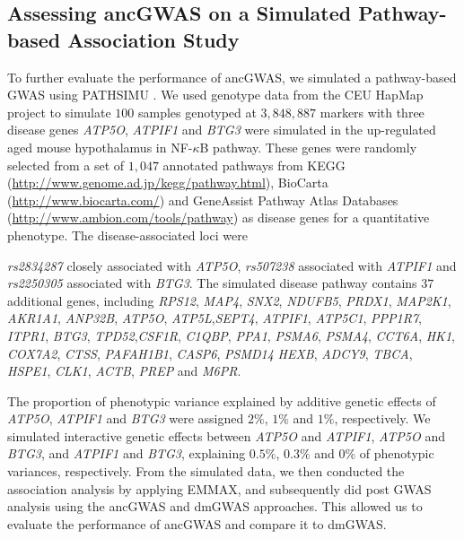 \documentclass[10pt]{article}
\begin{document}
\subsection*{Assessing ancGWAS on a Simulated Pathway-based Association Study}
\label{ancPath}

To further evaluate the performance of ancGWAS, we simulated a pathway-based GWAS using PATHSIMU \cite{pathsi}. We used genotype data from the CEU HapMap project \cite{hapm} to simulate $100$ samples genotyped at $3,848,887$ markers with three disease genes \textit{ATP5O}, \textit{ATPIF1} and \textit{BTG3} were simulated in the up-regulated aged mouse hypothalamus in NF-$\kappa$B pathway. These genes were randomly selected from a set of $1,047$ annotated pathways from KEGG (\url{http://www.genome.ad.jp/kegg/pathway.html}), BioCarta (\url{http://www.biocarta.com/}) and GeneAssist Pathway Atlas Databases (\url{http://www.ambion.com/tools/pathway}) as disease genes for a quantitative phenotype. The disease-associated loci were {\small \textit{rs2834287} closely associated with \textit{ATP5O}, \textit{rs507238} associated with \textit{ATPIF1} and \textit{rs2250305} associated with \textit{BTG3}. The simulated disease pathway contains $37$ additional genes, including \textit{RPS12}, \textit{MAP4}, \textit{SNX2}, \textit{NDUFB5}, \textit{PRDX1},  \textit{MAP2K1}, \textit{AKR1A1}, \textit{ANP32B}, \textit{ATP5O}, \textit{ATP5L},\textit{SEPT4},  \textit{ATPIF1}, \textit{ATP5C1}, \textit{PPP1R7}, \textit{ITPR1}, \textit{BTG3}, \textit{TPD52},\textit{CSF1R}, \textit{C1QBP}, \textit{PPA1}, \textit{PSMA6}, \textit{PSMA4}, \textit{CCT6A}, \textit{HK1}, \textit{COX7A2}, \textit{CTSS}, \textit{PAFAH1B1}, \textit{CASP6}, \textit{PSMD14} \textit{HEXB}, \textit{ADCY9}, \textit{TBCA}, \textit{HSPE1}, \textit{CLK1}, \textit{ACTB}, \textit{PREP} and \textit{M6PR}. 

The proportion of phenotypic variance explained by additive genetic effects of \textit{ATP5O}, \textit{ATPIF1} and \textit{BTG3} were assigned $2\%$, $1\%$ and $1\%$, respectively. We simulated interactive genetic effects between \textit{ATP5O} and \textit{ATPIF1}, \textit{ATP5O} and \textit{BTG3}, and \textit{ATPIF1} and \textit{BTG3}, explaining $0.5\%$, $0.3\%$ and $0\%$ of phenotypic variances, respectively. From the simulated data, we then conducted the association analysis by applying EMMAX, and subsequently did post GWAS analysis using the ancGWAS and dmGWAS \cite{jia} approaches. This allowed us to evaluate the performance of ancGWAS and compare it to dmGWAS.

}
\end{document}

